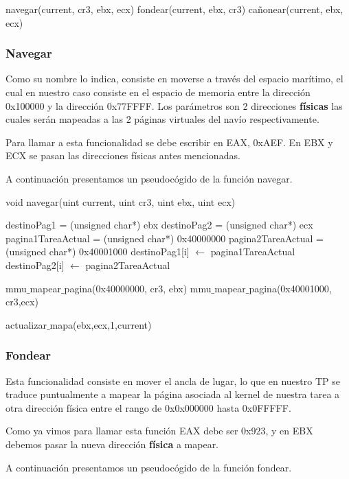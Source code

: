 \begin{algorithmic}
	\State navegar(current, cr3, ebx, ecx)
	\EndIf
		\State fondear(current, ebx, cr3)
	\EndIf
	\State cañonear(current, ebx, ecx)
	\EndIf
\end{algorithmic}

\subsubsection{Navegar}
\par{Como su nombre lo indica, consiste en moverse a través del espacio marítimo, el cual en nuestro caso consiste en el espacio de memoria entre la dirección 0x100000 y la dirección 0x77FFFF. Los parámetros son 2 direcciones \textbf{físicas} las cuales serán mapeadas a las 2 páginas virtuales del navío respectivamente.}
\par{Para llamar a esta funcionalidad se debe escribir en EAX, 0xAEF. En EBX y ECX se pasan las direcciones físicas antes mencionadas.}
\par{A continuación presentamos un pseudocógido de la función navegar.}

\begin{algorithm}[h!]
\caption{void navegar(uint current, uint cr3, uint ebx, uint ecx)}
\begin{algorithmic}
	\State destinoPag1 = (unsigned char*) ebx
	\State destinoPag2 = (unsigned char*) ecx
	\State pagina1TareaActual = (unsigned char*) 0x40000000
	\State pagina2TareaActual = (unsigned char*) 0x40001000
		\State destinoPag1[i] $\gets$ pagina1TareaActual
		\State destinoPag2[i] $\gets$ pagina2TareaActual
	\EndFor

	\State mmu$\_$mapear$\_$pagina(0x40000000, cr3, ebx)
	\State mmu$\_$mapear$\_$pagina(0x40001000, cr3,ecx)
	
	\State actualizar$\_$mapa(ebx,ecx,1,current)
	
\end{algorithmic}
\end{algorithm}


\subsubsection{Fondear}
\par{Esta funcionalidad consiste en mover el ancla de lugar, lo que en nuestro TP se traduce puntualmente a mapear la página asociada al kernel de nuestra tarea a otra dirección física entre el rango de 0x0x000000 hasta 0x0FFFFF.}
\par{Como ya vimos para llamar esta función EAX debe ser 0x923, y en EBX debemos pasar la nueva dirección \textbf{física} a mapear.}
\par{A continuación presentamos un pseudocógido de la función fondear.}

